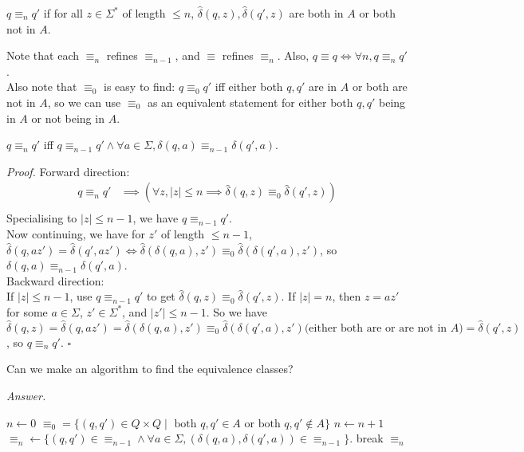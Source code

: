 \documentclass[a4paper]{article}
\newenvironment{proof}{\begin{breakbox}\textit{Proof.}}{\hfill$\square$\end{breakbox}}
\newenvironment{ans}{\begin{breakbox}\textit{Answer.}}{\end{breakbox}}
\newcommand{\nl}{\vspace{0.2cm}\\}
\newcommand{\hd}{\hat{\delta}}
\begin{document}
\begin{defn}
    $q \equiv_n q'$ if for all $z \in \Sigma^*$ of length $\le n$, $\hd(q, z), \hd(q', z)$ are both in $A$ or both not in $A$.
\end{defn}

\begin{note}
    Note that each $\equiv_n$ refines $\equiv_{n-1}$, and $\equiv$ refines $\equiv_n$. Also, $q \equiv q \iff \forall n, q \equiv_n q'$.\nl
    Also note that $\equiv_0$ is easy to find: $q \equiv_0 q'$ iff either both $q, q'$ are in $A$ or both are not in $A$, so we can use $\equiv_0$ as an equivalent statement for either both $q, q'$
    being in $A$ or not being in $A$.
\end{note}

\begin{claim}
    $q \equiv_n q'$ iff $q \equiv_{n-1} q' \land \forall a \in \Sigma, \delta(q, a) \equiv_{n-1} \delta(q', a)$.
\end{claim}

\begin{proof}
    Forward direction:\nl
    \begin{align*}    
        q \equiv_n q' &\implies (\forall z, |z| \le n \implies \hd(q, z) \equiv_0 \hd(q', z))\\
    \end{align*}
    Specialising to $|z| \le n - 1$, we have $q \equiv_{n-1} q'$.\nl
    Now continuing, we have for $z'$ of length $\le n - 1$, $\hd(q, az') = \hd(q', az') \iff \hd(\delta(q, a), z') \equiv_0 \hd(\delta(q', a), z')$, so $\delta(q, a) \equiv_{n-1} \delta(q',
        a)$.\nl
    Backward direction:\nl
    If $|z| \le n - 1$, use $q \equiv_{n-1} q'$ to get $\hd(q, z) \equiv_0 \hd(q', z)$.
    If $|z| = n$, then $z = az'$ for some $a \in \Sigma$, $z' \in \Sigma^*$, and $|z'| \le n - 1$. So we have $\hd(q, z) = \hd(q, az') = \hd(\delta(q, a), z') \equiv_0 \hd(\delta(q', a), z')
\text{(either both are or are not in $A$)} = \hd(q', z)$, so $q \equiv_n q'$.
\end{proof}

\begin{ques}
    Can we make an algorithm to find the equivalence classes?
\end{ques}

\begin{ans}
\begin{algorithmic}
        \State $n \gets 0$
        \State $\equiv_0 = \{(q, q') \in Q \times Q \mid \text{ both } q, q' \in A \text{ or both }q, q' \not\in A\}$
            \State $n \gets n + 1$
            \State $\equiv_n \gets \{(q, q') \in \equiv_{n-1} \land \forall a \in \Sigma, (\delta(q, a), \delta(q', a)) \in \equiv_{n-1}\}$.
                \State break
            \EndIf
        \EndWhile
        \State \Return $\equiv_n$
    \EndFunction
\end{algorithmic}
\end{ans}
\end{document}
